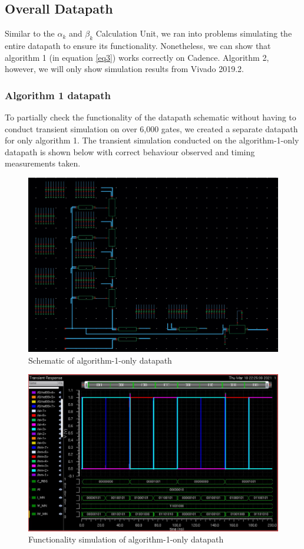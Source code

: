 \documentclass[letterpaper, 11pt]{article}
\begin{document}
	\subsection{Overall Datapath}
	\label{subsec:datapath}
	
	Similar to the $\alpha_k$ and $\beta_k$ Calculation Unit, we ran into problems simulating the entire datapath to ensure its functionality. Nonetheless, we can show that algorithm 1 (in equation \ref{eq3}) works correctly on Cadence. Algorithm 2, however, we will only show simulation results from Vivado 2019.2.
	
	\subsubsection{Algorithm 1 datapath}
	\label{subsubsec:algorithm1}
	To partially check the functionality of the datapath schematic without having to conduct transient simulation on over 6,000 gates, we created a separate datapath for only algorithm 1. The transient simulation conducted on the algorithm-1-only datapath is shown below with correct behaviour observed and timing measurements taken.  
	
	\begin{figure}[htb!]
		\centering
		\includegraphics[width=0.85\linewidth]{report_pics/algorithm1_schem.JPG}
		\caption{Schematic of algorithm-1-only datapath}
		\label{fig39}
	\end{figure}
	\newpage
	\begin{figure}[htb!]
		\centering
		\includegraphics[width=0.85\linewidth]{report_pics/algorithm1_sim_varied_input.JPG}
		\caption{Functionality simulation of algorithm-1-only datapath}
		\label{fig40}
	\end{figure}
	
\end{document}
